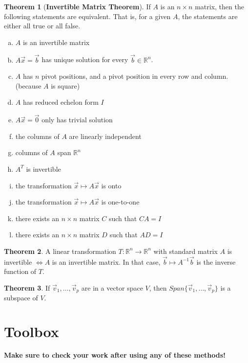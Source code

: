 \documentclass[a4paper,12pt]{article}
\theoremstyle{definition}
\newtheorem{theorem}{Theorem}
\theoremstyle{definition}
\newcommand{\mateq}[3]{#1#2 = #3}
\newcommand{\mateqaxb}{\mateq{A}{\vec{x}}{\vec{b}}}
\newcommand{\mateqaxo}{\mateq{A}{\vec{x}}{\vec{0}}}
\newcommand{\finitevecs}[2]{#1_1,\ldots,#1_#2}
\newcommand{\finitevecsset}[2]{\{\finitevecs{#1}{#2}\}}
\begin{document}
	\begin{theorem}[\textbf{Invertible Matrix Theorem}]
		\label{thm:imt-thm}
		If $A$ is an $n \times n$ matrix, then the following statements are equivalent. That
		is, for a given $A$, the statements are either all true or all false.
		
		\begin{enumerate}[a.]
			\item $A$ is an invertible matrix
			\item $\mateqaxb$ has unique solution for every $\vec{b} \in \mathbb{R}^n$.
			\item $A$ has $n$ pivot positions, and a pivot position in every row and column. (because $A$ is square)
			\item $A$ has reduced echelon form $I$
			\item $\mateqaxo$ only has trivial solution
			\item the columns of $A$ are linearly independent
			\item columns of $A$ span $\mathbb{R}^n$
			\item $A^T$ is invertible
			\item the transformation $\vec{x} \mapsto A\vec{x}$ is onto
			\item the transformation $\vec{x} \mapsto A\vec{x}$ is one-to-one
			\item there exists an $n \times n$ matrix $C$ such that $\mateq{C}{A}{I}$
			\item there exists an $n \times n$ matrix $D$ such that $\mateq{A}{D}{I}$
		\end{enumerate}
	\end{theorem}
	
	\begin{theorem}
		\label{thm:invertible-trans-thm}
		A linear transformation $T: \mathbb{R}^n \rightarrow \mathbb{R}^n$ with standard matrix $A$ is invertible $\Leftrightarrow A$ is an invertible matrix. In that case, $\vec{b} \mapsto A^{-1}\vec{b}$ is the inverse function of $T$.
	\end{theorem}
	
	\begin{theorem}
		\label{thm:span-subspace-thm}
		If $\finitevecs{\vec{v}}{p}$ are in a vector space $V$, then $Span\finitevecsset{\vec{v}}{p}$ is a subspace of $V$.
	\end{theorem}
	\newpage
	
	\section{Toolbox}
	\textbf{Make sure to check your work after using any of these methods!}
	
\end{document}
